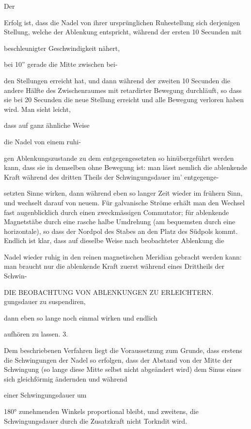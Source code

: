 \documentclass[12pt,a4paper]{article}
\begin{document}
Der

Erfolg ist, dass die Nadel von ihrer ursprünglichen Ruhestellung sich derjenigen Stellung, welche der Ablenkung entspricht, während der ersten 10 Secunden mit

beschleunigter Geschwindigkeit nähert,

bei 10” gerade die Mitte zwischen bei-

den Stellungen erreicht hat, und dann während der zweiten 10 Secunden die andere Hälfte des Zwischenraumes mit retardirter Bewegung durchläuft, so dass sie bei 20 Secunden die neue Stellung erreicht und alle Bewegung verloren haben wird. Man sieht leicht,

dass auf ganz ähnliche Weise

die Nadel von einem ruhi-

gen Ablenkungszustande zu dem entgegengesetzten so hinübergeführt werden kann, dass sie in demselben ohne Bewegung ist: man lässt nemlich die ablenkende Kraft während des dritten Theils der Schwingungsdauer im’ entgegenge-

setzten Sinne wirken, dann während eben so langer Zeit wieder im frühern Sinn, und wechselt darauf von neuem. Für galvanische Ströme erhält man den Wechsel fast augenblicklich durch einen zweckmässigen Commutator; für ablenkende Magnetstäbe durch eine rasche halbe Umdrehung (am bequemsten durch eine horizontale), so dass der Nordpol des Stabes an den Platz des Südpols kommt. Endlich ist klar, dass auf dieselbe Weise nach beobachteter Ablenkung die

Nadel wieder ruhig in den reinen magnetischen Meridian gebracht werden kann: man braucht nur die ablenkende Kraft zuerst während eines Drittheils der Schwin-

DIE BEOBACHTUNG VON ABLENKUNGEN ZU ERLEICHTERN. gungsdauer zu suspendiren,

dann eben so lange noch einmal wirken und endlich

aufhören zu lassen. 3.

Dem beschriebenen Verfahren liegt die Voraussetzung zum Grunde, dass erstens die Schwingungen der Nadel so erfolgen, dass der Abstand von der Mitte der Schwingung (so lange diese Mitte selbst nicht abgeändert wird) dem Sinus eines sich gleichförmig ändernden und während

einer Schwingungsdauer um

180° zunehmenden Winkels proportional bleibt, und zweitens, die Schwingungsdauer durch die Zusatzkraft nicht Torkndit wird.
\end{document}
